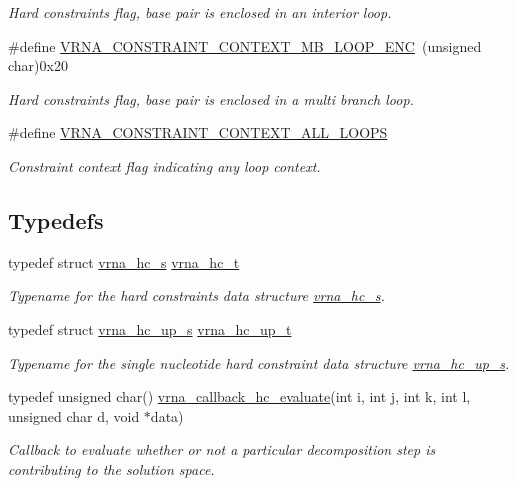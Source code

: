 \begin{DoxyCompactItemize}
\begin{DoxyCompactList}\small\item\em Hard constraints flag, base pair is enclosed in an interior loop. \end{DoxyCompactList}\item 
\#define \mbox{\hyperlink{group__hard__constraints_ga02a3d703ddbcfce393e4bbfcb9db7077}{V\+R\+N\+A\+\_\+\+C\+O\+N\+S\+T\+R\+A\+I\+N\+T\+\_\+\+C\+O\+N\+T\+E\+X\+T\+\_\+\+M\+B\+\_\+\+L\+O\+O\+P\+\_\+\+E\+NC}}~(unsigned char)0x20
\begin{DoxyCompactList}\small\item\em Hard constraints flag, base pair is enclosed in a multi branch loop. \end{DoxyCompactList}\item 
\#define \mbox{\hyperlink{group__hard__constraints_ga886d9127c49bb982a4b67cd7581e8a5a}{V\+R\+N\+A\+\_\+\+C\+O\+N\+S\+T\+R\+A\+I\+N\+T\+\_\+\+C\+O\+N\+T\+E\+X\+T\+\_\+\+A\+L\+L\+\_\+\+L\+O\+O\+PS}}
\begin{DoxyCompactList}\small\item\em Constraint context flag indicating any loop context. \end{DoxyCompactList}\end{DoxyCompactItemize}
\subsection*{Typedefs}
\begin{DoxyCompactItemize}
\item 
typedef struct \mbox{\hyperlink{group__hard__constraints_structvrna__hc__s}{vrna\+\_\+hc\+\_\+s}} \mbox{\hyperlink{group__hard__constraints_gac7e4c4f8abe3163a68110c5bff24e01d}{vrna\+\_\+hc\+\_\+t}}
\begin{DoxyCompactList}\small\item\em Typename for the hard constraints data structure \mbox{\hyperlink{group__hard__constraints_structvrna__hc__s}{vrna\+\_\+hc\+\_\+s}}. \end{DoxyCompactList}\item 
typedef struct \mbox{\hyperlink{group__hard__constraints_structvrna__hc__up__s}{vrna\+\_\+hc\+\_\+up\+\_\+s}} \mbox{\hyperlink{group__hard__constraints_ga8cd53427a942a81c87ec526bbff32ef9}{vrna\+\_\+hc\+\_\+up\+\_\+t}}
\begin{DoxyCompactList}\small\item\em Typename for the single nucleotide hard constraint data structure \mbox{\hyperlink{group__hard__constraints_structvrna__hc__up__s}{vrna\+\_\+hc\+\_\+up\+\_\+s}}. \end{DoxyCompactList}\item 
typedef unsigned char() \mbox{\hyperlink{group__hard__constraints_gae465f1d4a3d8b6592b38ecbb0d9f613d}{vrna\+\_\+callback\+\_\+hc\+\_\+evaluate}}(int i, int j, int k, int l, unsigned char d, void $\ast$data)
\begin{DoxyCompactList}\small\item\em Callback to evaluate whether or not a particular decomposition step is contributing to the solution space. \end{DoxyCompactList}\end{DoxyCompactItemize}
